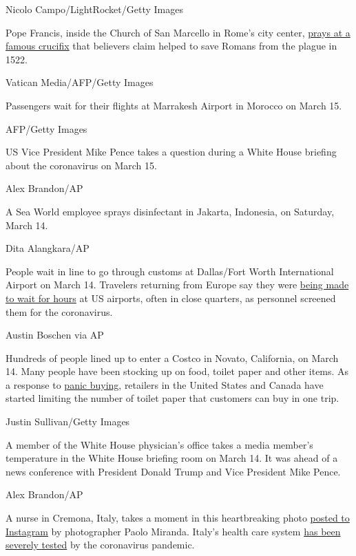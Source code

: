 Nicolo Campo/LightRocket/Getty Images

Pope Francis, inside the Church of San Marcello in Rome's city center,
\href{https://edition.cnn.com/2020/03/16/europe/pope-francis-prayer-coronavirus-plague-crucifix-intl/index.html}{prays
at a famous crucifix} that believers claim helped to save Romans from
the plague in 1522.

Vatican Media/AFP/Getty Images

Passengers wait for their flights at Marrakesh Airport in Morocco on
March 15.

AFP/Getty Images

US Vice President Mike Pence takes a question during a White House
briefing about the coronavirus on March 15.

Alex Brandon/AP

A Sea World employee sprays disinfectant in Jakarta, Indonesia, on
Saturday, March 14.

Dita Alangkara/AP

People wait in line to go through customs at Dallas/Fort Worth
International Airport on March 14. Travelers returning from Europe say
they were
\href{https://www.cnn.com/travel/article/coronavirus-airport-screening-sunday/index.html}{being
made to wait for hours} at US airports, often in close quarters, as
personnel screened them for the coronavirus.

Austin Boschen via AP

Hundreds of people lined up to enter a Costco in Novato, California, on
March 14. Many people have been stocking up on food, toilet paper and
other items. As a response to
\href{https://www.cnn.com/2020/03/09/health/toilet-paper-shortages-novel-coronavirus-trnd/index.html}{panic
buying,} retailers in the United States and Canada have started limiting
the number of toilet paper that customers can buy in one trip.

Justin Sullivan/Getty Images

A member of the White House physician's office takes a media member's
temperature in the White House briefing room on March 14. It was ahead
of a news conference with President Donald Trump and Vice President Mike
Pence.

Alex Brandon/AP

A nurse in Cremona, Italy, takes a moment in this heartbreaking photo
\href{https://www.instagram.com/p/B9yaP7jIdO-/}{posted to Instagram} by
photographer Paolo Miranda. Italy's health care system
\href{https://www.cnn.com/2020/03/18/europe/italy-coronavirus-lockdown-intl/index.html}{has
been severely tested} by the coronavirus pandemic.

